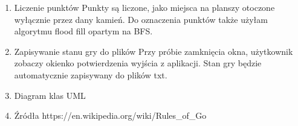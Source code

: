 \documentclass{article}
\begin{document}
\begin{enumerate}
    \item Liczenie punktów
    Punkty są liczone, jako miejsca na planszy otoczone wyłącznie
    przez dany kamień. Do oznaczenia punktów także użyłam algorytmu flood fill 
    opartym na BFS.

    \item Zapisywanie stanu gry do plików
    Przy próbie zamknięcia okna, użytkownik zobaczy okienko potwierdzenia
    wyjścia z aplikacji. Stan gry będzie automatycznie zapisywany do plików
    txt.

    \item Diagram klas UML
    
    \item Źródła
    https://en.wikipedia.org/wiki/Rules\_of\_Go
\end{enumerate}
\end{document}
